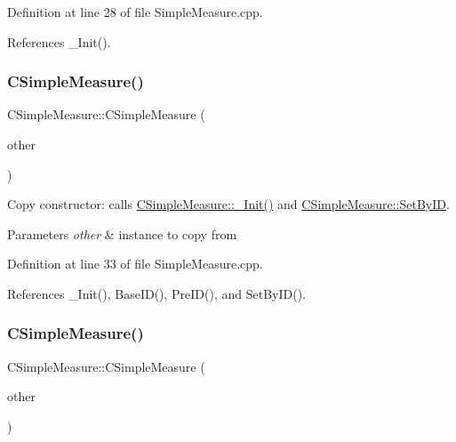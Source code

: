 Definition at line 28 of file Simple\+Measure.\+cpp.



References \+\_\+\+Init().

\mbox{\label{classCSimpleMeasure_a5dfc63fe4e75fb128991440c8b33b845}} 
\subsubsection{\texorpdfstring{C\+Simple\+Measure()}{CSimpleMeasure()}\hspace{0.1cm}{\footnotesize\ttfamily [2/3]}}
{\footnotesize\ttfamily C\+Simple\+Measure\+::\+C\+Simple\+Measure (\begin{DoxyParamCaption}\item[{const \hyperlink{classCSimpleMeasure}{C\+Simple\+Measure} \&}]{other }\end{DoxyParamCaption})}



Copy constructor\+: calls \hyperlink{classCSimpleMeasure_ada8744ac5a824143904a2ecaef2b0b70}{C\+Simple\+Measure\+::\+\_\+\+Init()} and \hyperlink{classCSimpleMeasure_a6945aa333dca5623482d38cd9a7e3225}{C\+Simple\+Measure\+::\+Set\+By\+ID}. 


\begin{DoxyParams}{Parameters}
{\em other} & instance to copy from \\
\hline
\end{DoxyParams}


Definition at line 33 of file Simple\+Measure.\+cpp.



References \+\_\+\+Init(), Base\+I\+D(), Pre\+I\+D(), and Set\+By\+I\+D().

\mbox{\label{classCSimpleMeasure_a0be2c11e276b999b8de941a5f94b0369}} 
\subsubsection{\texorpdfstring{C\+Simple\+Measure()}{CSimpleMeasure()}\hspace{0.1cm}{\footnotesize\ttfamily [3/3]}}
{\footnotesize\ttfamily C\+Simple\+Measure\+::\+C\+Simple\+Measure (\begin{DoxyParamCaption}\item[{const \hyperlink{classCSimpleMeasure}{C\+Simple\+Measure} $\ast$}]{other }\end{DoxyParamCaption})}



